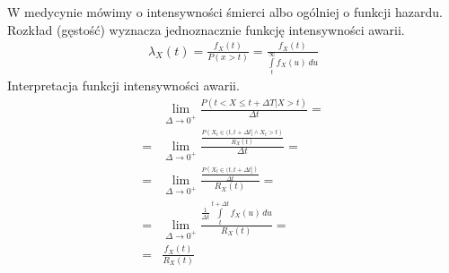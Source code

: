 W medycynie mówimy o intensywności śmierci albo ogólniej o funkcji hazardu. Rozkład (gęstość) wyznacza jednoznacznie funkcję intensywności awarii.
\begin{gather*}
\lambda_X(t)=\frac{f_X(t)}{P\left(x>t\right)}
=
\frac{f_X(t)}{\int\limits_{t}^{\infty }f_X(u)\,du}
\end{gather*}
Interpretacja funkcji intensywności awarii.
\begin{align*}
&\lim\limits_{\Delta\to0^+}\frac{P\left(t<X\le t+\Delta T|X>t\right)}{\Delta t}
=\\=&
\lim\limits_{\Delta\to0^+}\frac{\frac{P\left(X_t\in(t,t+\Delta t]\wedge X_t>t\right)}{R_X(t)}}{\Delta t}
=\\=&
\lim\limits_{\Delta\to0^+}\frac{\frac{P\left(X_t\in(t,t+\Delta t]\right)}{\Delta t}}{R_X(t)}
=\\=&
\lim\limits_{\Delta\to0^+}\frac{\frac{1}{\Delta t}\int\limits_{t}^{t+\Delta t}f_X(u)\,du}{R_X(t)}
=\\=&
\frac{f_X(t)}{R_X(t)}
\end{align*}